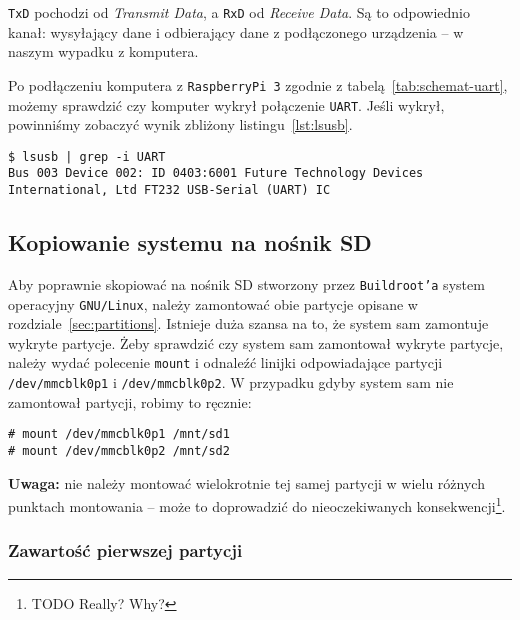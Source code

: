 \documentclass{article}
\begin{document}
\texttt{TxD} pochodzi od \emph{Transmit Data}, a \texttt{RxD} od \emph{Receive Data}. Są to odpowiednio kanał: wysyłający dane i odbierający dane z podłączonego urządzenia -- w naszym wypadku z komputera.

Po podłączeniu komputera z \texttt{RaspberryPi~3} zgodnie z tabelą~\ref{tab:schemat-uart}, możemy sprawdzić czy komputer wykrył połączenie \texttt{UART}. Jeśli wykrył, powinniśmy zobaczyć wynik zbliżony listingu~\ref{lst:lsusb}.
\begin{lstlisting}[basicstyle=\ttfamily,breaklines=true,label={lst:lsusb},captionpos=b,caption={Wynik komendy \texttt{lsusb} po podłączeniu \texttt{RaspberryPi} do komputera}]
$ lsusb | grep -i UART
Bus 003 Device 002: ID 0403:6001 Future Technology Devices International, Ltd FT232 USB-Serial (UART) IC
\end{lstlisting}


\subsection{Kopiowanie systemu na nośnik SD}

Aby poprawnie skopiować na nośnik SD stworzony przez \texttt{Buildroot'a} system operacyjny \texttt{GNU/Linux}, należy zamontować obie partycje opisane w rozdziale~\ref{sec:partitions}. Istnieje duża szansa na to, że system sam zamontuje wykryte partycje. Żeby sprawdzić czy system sam zamontował wykryte partycje, należy wydać polecenie \texttt{mount} i odnaleźć linijki odpowiadające partycji \texttt{/dev/mmcblk0p1} i \texttt{/dev/mmcblk0p2}. W przypadku gdyby system sam nie zamontował partycji, robimy to ręcznie:
\begin{lstlisting}[basicstyle=\ttfamily,breaklines=true]
# mount /dev/mmcblk0p1 /mnt/sd1
# mount /dev/mmcblk0p2 /mnt/sd2
\end{lstlisting}
\textbf{Uwaga:} nie należy montować wielokrotnie tej samej partycji w wielu różnych punktach montowania -- może to doprowadzić do nieoczekiwanych konsekwencji\footnote{TODO Really? Why?}.


\subsubsection{Zawartość pierwszej partycji}
\end{document}
